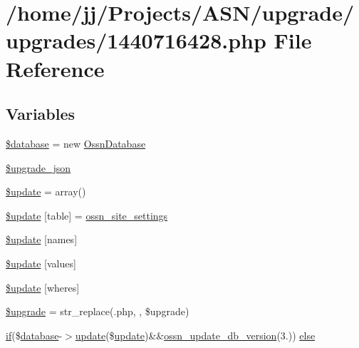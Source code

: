 \hypertarget{1440716428_8php}{}\section{/home/jj/\+Projects/\+A\+S\+N/upgrade/upgrades/1440716428.php File Reference}
\label{1440716428_8php}
\subsection*{Variables}
\begin{DoxyCompactItemize}
\item 
\hyperlink{1440716428_8php_a7691c0162d89de0b6ba47edcd8ba8878}{\$database} = new \hyperlink{class_ossn_database}{Ossn\+Database}
\item 
\hyperlink{1440716428_8php_a512525d0f5eb608ac72ca7b85e5fbf65}{\$upgrade\+\_\+json}
\item 
\hyperlink{1440716428_8php_a13a7db07df65d01cfbca768f443084cc}{\$update} = array()
\item 
\hyperlink{1440716428_8php_aee7ba5985ddf023a93862ab77e9718f9}{\$update} \mbox{[}\textquotesingle{}table\textquotesingle{}\mbox{]} = \textquotesingle{}\hyperlink{ossn_8lib_8system_8php_a610e2045b8a86c09f777b4d82e24e34c}{ossn\+\_\+site\+\_\+settings}\textquotesingle{}
\item 
\hyperlink{1440716428_8php_abcf5ad2e4fef35de04bef0168cc91ddc}{\$update} \mbox{[}\textquotesingle{}names\textquotesingle{}\mbox{]}
\item 
\hyperlink{1440716428_8php_ac82a75b4c6df37380ff77c88f041785e}{\$update} \mbox{[}\textquotesingle{}values\textquotesingle{}\mbox{]}
\item 
\hyperlink{1440716428_8php_aacde4479a904b32d0f24dea4e01f148c}{\$update} \mbox{[}\textquotesingle{}wheres\textquotesingle{}\mbox{]}
\item 
\hyperlink{1440716428_8php_a9084097ce600d3cc7a79a20ecaea9906}{\$upgrade} = str\+\_\+replace(\textquotesingle{}.php\textquotesingle{}, \textquotesingle{}\textquotesingle{}, \$upgrade)
\item 
\hyperlink{jquery_8tokeninput_8js_ad8dd46a3cbc004569e34401e9e71771a}{if}(\$\hyperlink{ossn_8config_8db_8example_8php_a4e0ca996705612048240f76ff8d4da95}{database}-\/$>$\hyperlink{_chart_8_doughnut_8js_ad58a8121caa8678969d1ff32848a77c4}{update}(\$\hyperlink{_chart_8_doughnut_8js_ad58a8121caa8678969d1ff32848a77c4}{update})\&\&\hyperlink{ossn_8lib_8upgrade_8php_aa7120e10a9c14b722b0e25c99bc86d92}{ossn\+\_\+update\+\_\+db\+\_\+version}(\textquotesingle{}3.\textquotesingle{})) \hyperlink{1440716428_8php_a3e9631379dea8422964f37834c5023c3}{else}
\end{DoxyCompactItemize}


